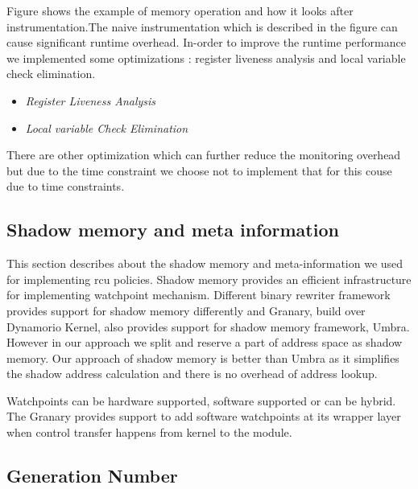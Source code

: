 Figure shows the example of memory operation and how it looks after instrumentation.The naive instrumentation which is described in the figure can cause significant runtime overhead. In-order to improve the runtime performance we implemented some optimizations : register liveness analysis and local variable check elimination. 

\begin{itemize}
\item \emph{Register Liveness Analysis}
\item \emph{Local variable Check Elimination}
\end{itemize} 

There are other optimization which can further reduce the monitoring overhead but due to the time constraint we choose not to implement that for this couse due to time constraints.


\subsection{Shadow memory and meta information}
This section describes about the shadow memory and meta-information we used for implementing rcu policies. Shadow memory provides an efficient infrastructure for implementing watchpoint mechanism. Different binary rewriter framework provides support for shadow memory differently and Granary, build over Dynamorio Kernel, also provides support for shadow memory framework, Umbra. However in our approach we split and reserve a part of address space as shadow memory. Our approach of shadow memory is better than Umbra as it simplifies the shadow address calculation and there is no overhead of address lookup. 


Watchpoints can be hardware supported, software supported or can be hybrid. The Granary provides support to add software watchpoints at its wrapper layer when control transfer happens from kernel to the module.

\subsection{Generation Number}
